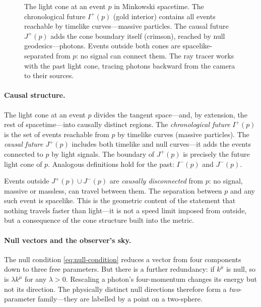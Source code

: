 \begin{figure}[htbp]
  \centering
  
  \caption[The light cone at an event $p$ in Minkowski spacetime]{The light cone at an event $p$ in Minkowski spacetime.  The
    chronological future $I^+(p)$ (gold interior) contains all events
    reachable by timelike curves---massive particles.  The causal future
    $J^+(p)$ adds the cone boundary itself (crimson), reached by null
    geodesics---photons.  Events outside both cones are spacelike-separated
    from $p$: no signal can connect them.  The ray tracer works with the past
    light cone, tracing photons backward from the camera to their sources.}
  \label{fig:light-cone-causal}
\end{figure}

\paragraph{Causal structure.}

The light cone at an event $p$ divides the tangent space---and, by extension,
the rest of spacetime---into causally distinct regions.  The \emph{chronological
future} $I^+(p)$ is the set of events reachable from $p$ by timelike curves
(massive particles).  The \emph{causal future} $J^+(p)$ includes both timelike
and null curves---it adds the events connected to $p$ by light signals.  The
boundary of $J^+(p)$ is precisely the future light cone of $p$.  Analogous
definitions hold for the past: $I^-(p)$ and $J^-(p)$.

Events outside $J^+(p) \cup J^-(p)$ are \emph{causally disconnected} from $p$:
no signal, massive or massless, can travel between them.  The separation
between $p$ and any such event is spacelike.  This is the geometric content of
the statement that nothing travels faster than light---it is not a speed limit
imposed from outside, but a consequence of the cone structure built into the
metric.

\paragraph{Null vectors and the observer's sky.}

The null condition \cref{eq:null-condition} reduces a vector from four
components down to three free parameters.  But there is a further redundancy: if $k^\mu$ is
null, so is $\lambda k^\mu$ for any $\lambda > 0$.  Rescaling a photon's
four-momentum changes its energy but not its direction.  The physically
distinct null directions therefore form a \emph{two}-parameter family---they
are labelled by a point on a two-sphere.

